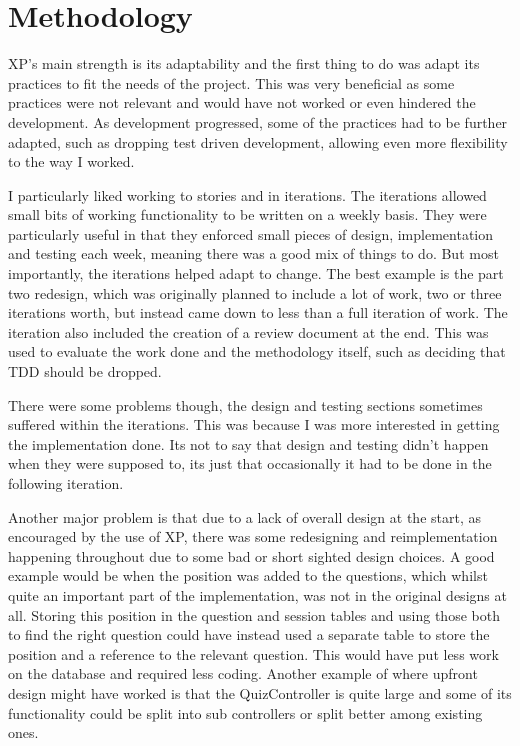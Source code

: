 \section{Methodology}
XP's main strength is its adaptability and the first thing to do was adapt its practices to fit the needs of the project. This was very beneficial as some practices were not relevant and would have not worked or even hindered the development. As development progressed, some of the practices had to be further adapted, such as dropping test driven development, allowing even more flexibility to the way I worked.

I particularly liked working to stories and in iterations. The iterations allowed small bits of working functionality to be written on a weekly basis. They were particularly useful in that they enforced small pieces of design, implementation and testing each week, meaning there was a good mix of things to do. But most importantly, the iterations helped adapt to change. The best example is the part two redesign, which was originally planned to include a lot of work, two or three iterations worth, but instead came down to less than a full iteration of work. The iteration also included the creation of a review document at the end. This was used to evaluate the work done and the methodology itself, such as deciding that TDD should be dropped.

There were some problems though, the design and testing sections sometimes suffered within the iterations. This was because I was more interested in getting the implementation done. Its not to say that design and testing didn't happen when they were supposed to, its just that occasionally it had to be done in the following iteration.

Another major problem is that due to a lack of overall design at the start, as encouraged by the use of XP, there was some redesigning and reimplementation happening throughout due to some bad or short sighted design choices. A good example would be when the position was added to the questions, which whilst quite an important part of the implementation, was not in the original designs at all. Storing this position in the question and session tables and using those both to find the right question could have instead used a separate table to store the position and a reference to the relevant question. This would have put less work on the database and required less coding. Another example of where upfront design might have worked is that the QuizController is quite large and some of its functionality could be split into sub controllers or split better among existing ones.

